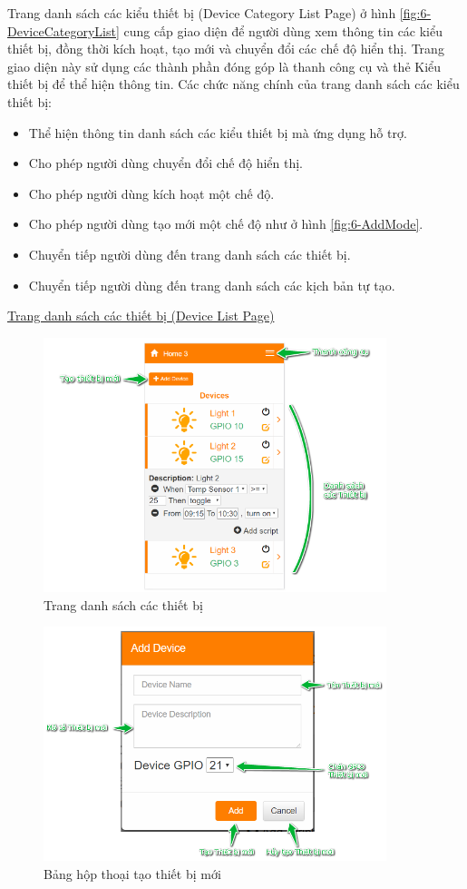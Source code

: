 \documentclass[12pt,a4paper,oneside]{extbook}
\begin{document}
Trang danh sách các kiểu thiết bị (Device Category List Page) ở hình \ref{fig:6-DeviceCategoryList} cung cấp giao diện để người dùng xem thông tin các kiểu thiết bị, đồng thời kích hoạt, tạo mới và chuyển đổi các chế độ hiển thị. Trang giao diện này sử dụng các thành phần đóng góp là thanh công cụ và thẻ Kiểu thiết bị để thể hiện thông tin. Các chức năng chính của trang danh sách các kiểu thiết bị:

\begin{itemize}[topsep=1mm,itemsep=-0.5mm]
\item Thể hiện thông tin danh sách các kiểu thiết bị mà ứng dụng hỗ trợ.
\item Cho phép người dùng chuyển đổi chế độ hiển thị.
\item Cho phép người dùng kích hoạt một chế độ.

\item Cho phép người dùng tạo mới một chế độ như ở hình \ref{fig:6-AddMode}.
\item Chuyển tiếp người dùng đến trang danh sách các thiết bị.
\item Chuyển tiếp người dùng đến trang danh sách các kịch bản tự tạo.
\vspace{1mm}
\end{itemize}

\underline{Trang danh sách các thiết bị (Device List Page)}

\begin{figure}[h]
  \centering
     \includegraphics[width=10cm]{6-DeviceListPage}
  \caption{Trang danh sách các thiết bị}\label{fig:6-DeviceListPage}
\end{figure}

\begin{figure}[h]
  \centering
     \includegraphics[width=10cm]{6-AddDevice}
  \caption{Bảng hộp thoại tạo thiết bị mới}\label{fig:6-AddDevice}
\end{figure}
\end{document}
